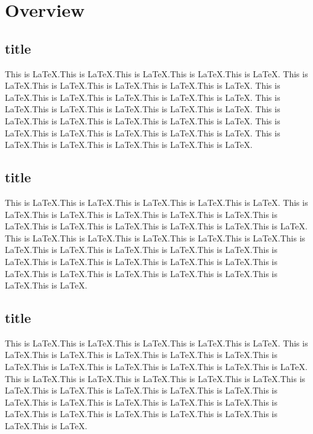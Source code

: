 \documentclass{book}
\begin{document}
\tableofcontents

\chapter{Overview}
\setcounter{page}{1} %
\section{title}
This is LaTeX.This is LaTeX.This is LaTeX.This is LaTeX.This is LaTeX.
This is LaTeX.This is LaTeX.This is LaTeX.This is LaTeX.This is LaTeX.
This is LaTeX.This is LaTeX.This is LaTeX.This is LaTeX.This is LaTeX.
This is LaTeX.This is LaTeX.This is LaTeX.This is LaTeX.This is LaTeX.
This is LaTeX.This is LaTeX.This is LaTeX.This is LaTeX.This is LaTeX.
This is LaTeX.This is LaTeX.This is LaTeX.This is LaTeX.This is LaTeX.
This is LaTeX.This is LaTeX.This is LaTeX.This is LaTeX.This is LaTeX.

\section{title}
This is LaTeX.This is LaTeX.This is LaTeX.This is LaTeX.This is LaTeX.
This is LaTeX.This is LaTeX.This is LaTeX.This is LaTeX.This is LaTeX.This is LaTeX.This is LaTeX.This is LaTeX.This is LaTeX.This is LaTeX.This is LaTeX.
This is LaTeX.This is LaTeX.This is LaTeX.This is LaTeX.This is LaTeX.This is LaTeX.This is LaTeX.This is LaTeX.This is LaTeX.This is LaTeX.This is LaTeX.This is LaTeX.This is LaTeX.This is LaTeX.This is LaTeX.This is LaTeX.This is LaTeX.This is LaTeX.This is LaTeX.This is LaTeX.This is LaTeX.This is LaTeX.

\section{title}
This is LaTeX.This is LaTeX.This is LaTeX.This is LaTeX.This is LaTeX.
This is LaTeX.This is LaTeX.This is LaTeX.This is LaTeX.This is LaTeX.This is LaTeX.This is LaTeX.This is LaTeX.This is LaTeX.This is LaTeX.This is LaTeX.
This is LaTeX.This is LaTeX.This is LaTeX.This is LaTeX.This is LaTeX.This is LaTeX.This is LaTeX.This is LaTeX.This is LaTeX.This is LaTeX.This is LaTeX.This is LaTeX.This is LaTeX.This is LaTeX.This is LaTeX.This is LaTeX.This is LaTeX.This is LaTeX.This is LaTeX.This is LaTeX.This is LaTeX.This is LaTeX.
\end{document}
